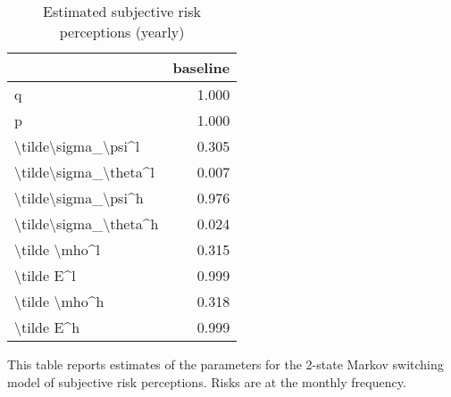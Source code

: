 
\begin{table}[p]
\centering
\begin{adjustbox}{width=0.3\textwidth}
\begin{threeparttable}
\caption{Estimated subjective risk perceptions (yearly)}
\label{tab:PRMarkovEst}\begin{tabular}{lr}
\toprule
{} &  baseline \\
\midrule
q                     &     1.000 \\
p                     &     1.000 \\
\textbackslash tilde\textbackslash sigma\_\textbackslash psi\textasciicircum l   &     0.305 \\
\textbackslash tilde\textbackslash sigma\_\textbackslash theta\textasciicircum l &     0.007 \\
\textbackslash tilde\textbackslash sigma\_\textbackslash psi\textasciicircum h   &     0.976 \\
\textbackslash tilde\textbackslash sigma\_\textbackslash theta\textasciicircum h &     0.024 \\
\textbackslash tilde \textbackslash mho\textasciicircum l         &     0.315 \\
\textbackslash tilde E\textasciicircum l            &     0.999 \\
\textbackslash tilde \textbackslash mho\textasciicircum h         &     0.318 \\
\textbackslash tilde E\textasciicircum h            &     0.999 \\
\bottomrule
\end{tabular}
\begin{tablenotes}\item This table reports estimates of the parameters 
for the 2-state Markov switching model of subjective risk perceptions. Risks are at the monthly frequency. 
\end{tablenotes}
\end{threeparttable}
\end{adjustbox}
\end{table}